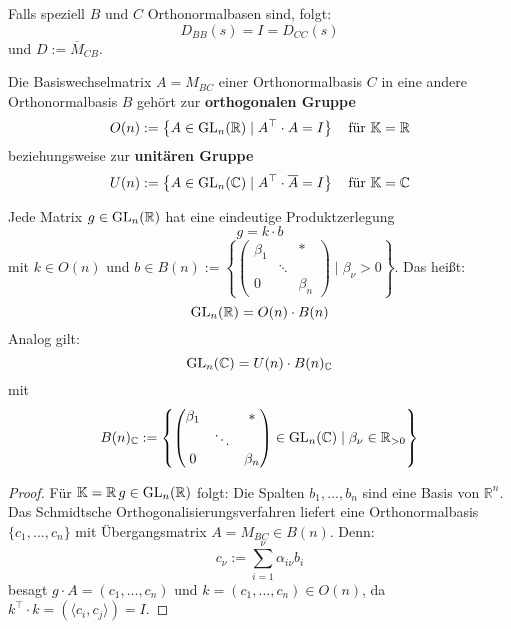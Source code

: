 \documentclass[parskip,a4paper,twoside,DIV15,BCOR12mm]{scrbook}
\begin{document}
Falls speziell \(B\) und \(C\) Orthonormalbasen sind, folgt:
\[
D_{BB}(s)=I=D_{CC}(s)
\]
und \(D:=\overline{M}_{CB}\).
\begin{conclusion}
Die Basiswechselmatrix \(A=M_{BC}\) einer Orthonormalbasis \(C\) in eine andere
Orthonormalbasis \(B\) gehört zur \textbf{orthogonalen Gruppe}
\[
O(n):=\left\{A\in\operatorname{GL}_{n}(\mathbb{R})\mid A^{\top}\cdot A=I\right\}\quad
    \text{für } \mathbb{K}=\mathbb{R}
\]
beziehungsweise zur \textbf{unitären Gruppe}
\[
U(n):=\left\{A\in\operatorname{GL}_{n}(\mathbb{C})\mid A^{\top}\cdot\overline{A}=I\right\}
    \quad\text{für } \mathbb{K}=\mathbb{C}
\]
\end{conclusion}
\begin{comment}
\(O(n)\), beziehungsweise \(U(n)\), ist eine Untergruppe von 
\(\GL_{n}(\mathbb{R})\), beziehungsweise \(\GL_{n}(\mathbb{C})\).
\end{comment}
\begin{conclusion}
Jede Matrix \(g\in\operatorname{GL}_{n}(\mathbb{R})\) hat eine eindeutige Produktzerlegung
\[
g=k\cdot b
\]
mit \(k\in O(n)\) und \(b\in B(n):=\left\{
    \begin{pmatrix}\beta_{1}&&*\\&\ddots&\\0&&\beta_{n}\end{pmatrix}\mid
    \beta_{\nu}>0\right\}\).
Das heißt:
\[
\operatorname{GL}_{n}(\mathbb{R})=O(n)\cdot B(n)
\]
Analog gilt: 
\[
\operatorname{GL}_{n}(\mathbb{C})=U(n)\cdot B(n)_{\mathbb{C}}
\]
mit
\[
B(n)_{\mathbb{C}}:=\left\{
    \begin{pmatrix}\beta_{1}&&*\\&\ddots&\\0&&\beta_{n}\end{pmatrix}\in
	\operatorname{GL}_{n}(\mathbb{C})\mid\beta_{\nu}\in\mathbb{R}_{>0}
    \right\}
\]
\end{conclusion}
\begin{proof}
Für \(\mathbb{K}=\mathbb{R}\,g\in\operatorname{GL}_{n}(\mathbb{R})\) folgt: Die Spalten
\(b_{1},\ldots,b_{n}\) sind eine Basis von \(\mathbb{R}^{n}\).\\
Das Schmidtsche Orthogonalisierungsverfahren liefert eine Orthonormalbasis
\(\{c_{1},\ldots,c_{n}\}\) mit \"Ubergangsmatrix \(A=M_{BC}\in B(n)\). Denn:
\[
c_{\nu}:=\sum_{i=1}^{\nu}{\alpha_{i\nu}b_{i}}
\]
besagt \(g\cdot A=(c_{1},\ldots,c_{n})\) und \(k=(c_{1},\ldots,c_{n})\in O(n)\),
da \(k^{\top}\cdot k=\left(\langle c_{i},c_{j}\rangle\right)=I\).
\end{proof}
\end{document}
